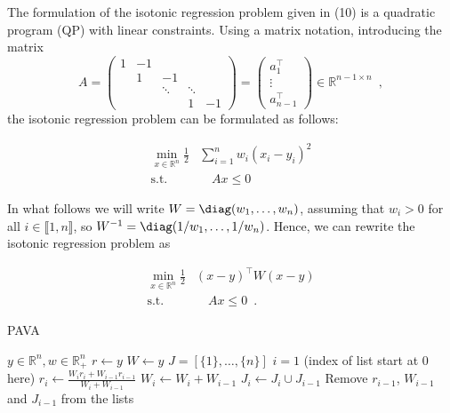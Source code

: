 \documentclass[12pt,preprint]{elsarticle}
\begin{document}
The formulation of the isotonic regression problem given in (10) is a quadratic program (QP) with linear constraints.
Using a matrix notation, introducing the matrix
$$A = \begin{pmatrix} 1 & -1 &                       &                       &    \\
  & 1  & -1                    &                       &    \\
  &    & \ddots & \ddots &    \\
  &    &                       & 1                     & -1\end{pmatrix}
 =
\begin{pmatrix}
a_1^\top \\
\vdots   \\
a_{n-1}^\top
\end{pmatrix}
 \in \mathbb{R}^{n-1 \times n}\enspace,
$$
the isotonic regression problem can be formulated as follows:

\begin{align}
\min_{x \in \mathbb{R}^n}
\frac{1}{2}
& \sum_{i=1}^{n} w_i (x_i - y_i)^2 \\
\text{s.t.} & \quad Ax \leq 0 \nonumber
\end{align}




In what follows we will write $W=\diag(w_1,\dots,w_n)$, assuming that $w_i > 0$ for all $i \in \llbracket 1, n \rrbracket$, so $W^{-1}= \diag(1/w_1,\dots,1/w_n)$.
Hence, we can rewrite the isotonic regression problem as


\begin{align}
\min_{x \in \mathbb{R}^n}
\frac{1}{2}
& (x-y)^\top W (x-y) \\
\text{s.t.} & \quad Ax \leq 0 \enspace.
\end{align}

\begin{algorithm}[ht]
\caption{PAVA}\label{alg:cap}
\begin{algorithmic}
\Require $y \in\mathbb{R}^n, w \in \mathbb{R}^n_{+}$
\STATE $r \leftarrow y$
\STATE $W \leftarrow y$
\STATE $J = [\{1\},\dots, \{n\}]$ 
\STATE $i=1$ (index of list start at 0 here)
     
        \State $r_i \leftarrow \frac{W_i r_i + W_{i-1} r_{i-1}}{W_i + W_{i-1}}$
        \State $W_i \leftarrow W_i + W_{i-1}$
        \State $J_i \leftarrow J_i \cup J_{i-1}$
        \State Remove $r_{i-1}$, $W_{i-1}$ and $J_{i-1}$ from the lists
        \ENDIF
    \ELSE
    \ENDIF
\ENDWHILE
{}
\ENDFOR
{}
\end{algorithmic}
\end{algorithm}
\end{document}
